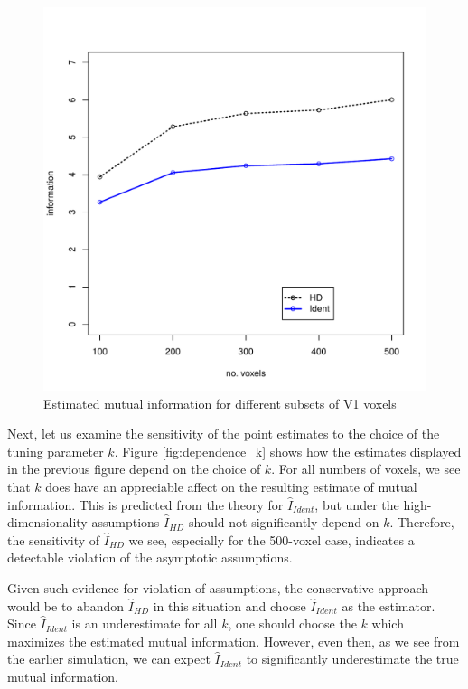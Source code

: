 \begin{figure}
\centering
\includegraphics[scale = 0.5]{../../Yuval/info_infer_edited.pdf}
\caption{Estimated mutual information for different subsets of V1 voxels}
\label{fig:n_voxels_vs_mi}
\end{figure}

Next, let us examine the sensitivity of the point estimates to the
choice of the tuning parameter $k$.  Figure \ref{fig:dependence_k}
shows how the estimates displayed in the previous figure depend on the
choice of $k$.  For all numbers of voxels, we see that $k$ does have
an appreciable affect on the resulting estimate of mutual information.
This is predicted from the theory for $\hat{I}_{Ident}$, but under the
high-dimensionality assumptions $\hat{I}_{HD}$ should not
significantly depend on $k$.  Therefore, the sensitivity of
$\hat{I}_{HD}$ we see, especially for the 500-voxel case, indicates a
detectable violation of the asymptotic assumptions.

Given such evidence for violation of assumptions, the conservative
approach would be to abandon $\hat{I}_{HD}$ in this situation and
choose $\hat{I}_{Ident}$ as the estimator. Since $\hat{I}_{Ident}$ is
an underestimate for all $k$, one should choose the $k$ which
maximizes the estimated mutual information.  However, even then, as we
see from the earlier simulation, we can expect $\hat{I}_{Ident}$ to
significantly underestimate the true mutual information.

